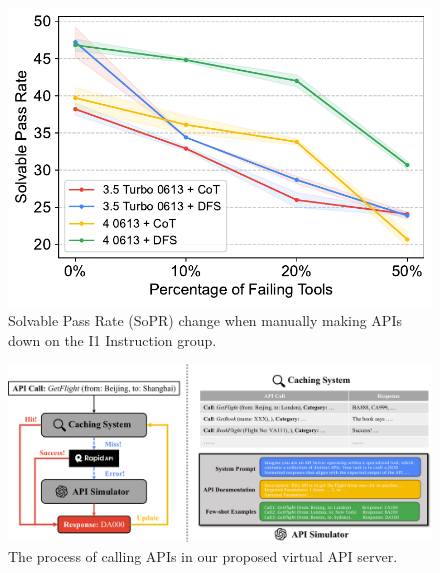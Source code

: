 




\begin{figure}[h!]
    \centering
    \includegraphics[width=\linewidth]{figs/real_solving_scores.pdf}
    \caption{Solvable Pass Rate (SoPR) change when manually making APIs down on the I1 Instruction group.}
    \label{fig:real_api_stability_test}
\end{figure}


\begin{figure}[t!]
    \centering
    \includegraphics[width=\textwidth]{figs/main_figure.pdf} 
    \caption{The process of calling APIs in our proposed virtual API server.}
    \label{fig:main_figure}
\end{figure}


